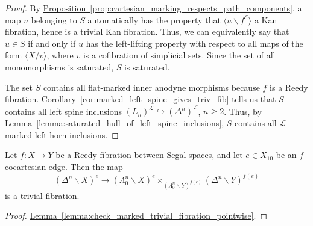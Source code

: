 \documentclass[main.tex]{subfiles}
\begin{document}
\begin{proof}
  By \hyperref[prop:cartesian_marking_respects_path_components]{Proposition~\ref*{prop:cartesian_marking_respects_path_components}}, a map $u$ belonging to $S$ automatically has the property that $\langle u \backslash f^{\mathcal{E}} \rangle$ a Kan fibration, hence is a trivial Kan fibration. Thus, we can equivalently say that $u \in S$ if and only if $u$ has the left-lifting property with respect to all maps of the form $\langle X / v \rangle$, where $v$ is a cofibration of simplicial sets. Since the set of all monomorphisms is saturated, $S$ is saturated.

  The set $S$ contains all flat-marked inner anodyne morphisms because $f$ is a Reedy fibration. \hyperref[cor:marked_left_spine_gives_triv_fib]{Corollary~\ref*{cor:marked_left_spine_gives_triv_fib}} tells us that $S$ contains all left spine inclusions $(L_{n})^{\mathcal{L}} \hookrightarrow (\Delta^{n})^{\mathcal{L}}$, $n \geq 2$. Thus, by \hyperref[lemma:saturated_hull_of_left_spine_inclusions]{Lemma~\ref*{lemma:saturated_hull_of_left_spine_inclusions}}, $S$ contains all $\mathcal{L}$-marked left horn inclusions.
\end{proof}

\begin{corollary}
  \label{cor:pointwise_left_horn_condition}
  Let $f\colon X \to Y$ be a Reedy fibration between Segal spaces, and let $e \in X_{10}$ be an $f$-cocartesian edge. Then the map
  \begin{equation*}
    (\Delta^{n} \backslash X)^{e} \to (\Lambda^{n}_{0} \backslash X)^{e} \times_{(\Lambda^{n}_{0} \backslash Y)^{f(e)}} (\Delta^{n} \backslash Y)^{f(e)}
  \end{equation*}
  is a trivial fibration.
\end{corollary}
\begin{proof}
  \hyperref[lemma:check_marked_trivial_fibration_pointwise]{Lemma~\ref*{lemma:check_marked_trivial_fibration_pointwise}}.
\end{proof}
\end{document}

